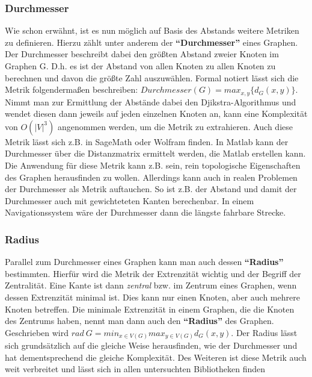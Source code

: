 \documentclass[a4paper,12pt,ngerman,chapterprefix=false,listof=totoc,bibliography=totoc]{scrreprt}
\begin{document}
{\subsubsection*{Durchmesser}
{
Wie schon erwähnt, ist es nun möglich auf Basis des Abstands weitere Metriken zu definieren. Hierzu zählt unter anderem der \textbf{"`Durchmesser"'} eines Graphen. Der Durchmesser beschreibt dabei den größten Abstand zweier Knoten im Graphen G. \cite{diestel_graphentheorie_2000} D.h. es ist der Abstand von allen Knoten zu allen Knoten zu berechnen und davon die größte Zahl auszuwählen. Formal notiert lässt sich die Metrik folgendermaßen beschreiben: \(Durchmesser(G)=max_{x,y}\{ d_G (x,y)\}\). Nimmt man zur Ermittlung der Abstände dabei den Djikstra-Algorithmus und wendet diesen dann jeweils auf jeden einzelnen Knoten an, kann eine Komplexität von \(O(\vert V\vert ^3)\) angenommen werden, um die Metrik zu extrahieren. Auch diese Metrik lässt sich z.B. in SageMath oder Wolfram finden. In Matlab kann der Durchmesser über die Distanzmatrix ermittelt werden, die Matlab erstellen kann. \cite{sagemath_graph_2020,matlab_shortest_2020,wolfram_graph_2020} Die Anwendung für diese Metrik kann z.B. sein, rein topologische Eigenschaften des Graphen herausfinden zu wollen. Allerdings kann auch in realen Problemen der Durchmesser als Metrik auftauchen. So ist z.B. der Abstand und damit der Durchmesser auch mit gewichteteten Kanten berechenbar. \cite{sagemath_graph_2020,gitta_durchmesser_2014} In einem Navigationssystem wäre der Durchmesser dann die längste fahrbare Strecke.
}
\subsubsection*{Radius}
{
Parallel zum Durchmesser eines Graphen kann man auch dessen \textbf{"`Radius"'} bestimmten. Hierfür wird die Metrik der Extrenzität wichtig und der Begriff der Zentralität. Eine Kante ist dann \textit{zentral} bzw. im Zentrum eines Graphen, wenn dessen Extrenzität minimal ist. Dies kann nur einen Knoten, aber auch mehrere Knoten betreffen. Die minimale Extrenzität in einem Graphen, die die Knoten des Zentrums haben, nennt man dann auch den \textbf{"`Radius"'} des Graphen. Geschrieben wird \(rad\ G = min_{x\in V(G)}max_{y\in V(G)}d_G(x,y)\). \cite{diestel_graphentheorie_2000} Der Radius lässt sich grundsätzlich auf die gleiche Weise herausfinden, wie der Durchmesser und hat dementsprechend die gleiche Komplexität. Des Weiteren ist diese Metrik auch weit verbreitet und lässt sich in allen untersuchten Bibliotheken finden \cite{sagemath_graph_2020,wolfram_graph_2020,matlab_shortest_2020}
}
}
\end{document}
